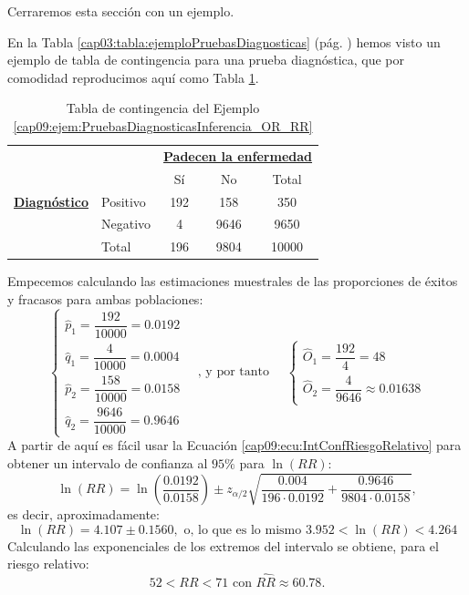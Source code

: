 Cerraremos esta sección con un ejemplo.
\begin{ejemplo}
\label{cap09:ejem:PruebasDiagnosticasInferencia_OR_RR}
En la Tabla \ref{cap03:tabla:ejemploPruebasDiagnosticas} (pág. \pageref{cap03:tabla:ejemploPruebasDiagnosticas}) hemos visto un ejemplo de tabla de contingencia para una prueba diagnóstica, que por comodidad reproducimos aquí como Tabla \ref{cap09:tabla:ejemploPruebasDiagnosticas}.

\begin{table}[h!]
        \begin{center}
            \begin{tabular}{llccc}
            &&\multicolumn{3}{c}{\underline{\bf Padecen la enfermedad}}\\

                                      &          & Sí &  No & Total\\
            \hline
          \underline{\bf Diagnóstico} & Positivo & 192&  158&   350\\
                                      & Negativo &  4 & 9646&  9650\\
            \cline{2-5}
                                      & Total    & 196& 9804& 10000\\
            \hline
            \end{tabular}
        \end{center}
        \caption{Tabla de contingencia del Ejemplo \ref{cap09:ejem:PruebasDiagnosticasInferencia_OR_RR}}
        \label{cap09:tabla:ejemploPruebasDiagnosticas}
\end{table}
Empecemos calculando las estimaciones muestrales de las proporciones de éxitos y fracasos para ambas poblaciones:
\[
\begin{cases}
    \hat p_1=\dfrac{192}{10000}=0.0192\\[3mm]
    \hat q_1=\dfrac{4}{10000}=0.0004\\[3mm]
    \hat p_2=\dfrac{158}{10000}=0.0158\\[3mm]
    \hat q_2=\dfrac{9646}{10000}=0.9646
\end{cases}
\quad
\mbox{, y por tanto }
\quad
\begin{cases}
    \hat O_1=\dfrac{192}{4}=48\\[3mm]
    \hat O_2=\dfrac{4}{9646}\approx 0.01638
\end{cases}
\]
A partir de aquí es fácil usar la Ecuación \ref{cap09:ecu:IntConfRiesgoRelativo} para obtener un intervalo de confianza al $95\%$ para $\ln(RR)$:
\[
\ln(RR)=\ln\left(\dfrac{0.0192}{0.0158}\right)\pm z_{\alpha/2}\sqrt{\dfrac{0.004}{196\cdot 0.0192}+\dfrac{0.9646}{9804\cdot 0.0158}},
\]
es decir, aproximadamente:
\[
\ln(RR)=4.107\pm 0.1560,\mbox{ o, lo que es lo mismo } 3.952<\ln(RR)<4.264
\]
Calculando las exponenciales de los extremos del intervalo se obtiene, para el riesgo relativo:
\[52< RR < 71\mbox { con }\widehat{RR}\approx 60.78.\]


\end{ejemplo}
